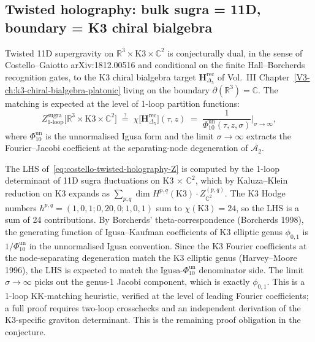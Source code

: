 \subsection{Twisted holography: bulk sugra = 11D, boundary = K3
chiral bialgebra}
\label{subsec:costello-twisted-holography}

\begin{conjecture}
\label{conj:costello-twisted-holography-matching}
Twisted 11D supergravity on
$\mathbb{R}^3 \times \mathrm{K3} \times \mathbb{C}^2$
is conjecturally dual, in the sense of Costello--Gaiotto
arXiv:1812.00516 and conditional on the finite Hall--Borcherds
recognition gates, to the K3 chiral bialgebra target
$\mathbf{H}_{\Delta_5}^{\mathrm{rec}}$ of Vol.~III
Chapter~\ref{V3-ch:k3-chiral-bialgebra-platonic} living on the
boundary $\partial(\mathbb{R}^3) = \mathbb{C}$. The matching is
expected at the level of 1-loop partition functions:
\begin{equation}
\label{eq:costello-twisted-holography-Z}
Z^{\mathrm{sugra}}_{1\text{-loop}}
 \bigl[\mathbb{R}^3\times\mathrm{K3}\times\mathbb{C}^2\bigr]
\;\stackrel{?}{=}\;
\chi\bigl[\mathbf{H}_{\Delta_5}^{\mathrm{rec}}\bigr](\tau,z)
\;=\;
\frac{1}{\Phi_{10}^{\mathrm{un}}(\tau,z,\sigma)}\bigg|_{\sigma\to\infty},
\end{equation}
where $\Phi_{10}^{\mathrm{un}}$ is the unnormalised Igusa form and the limit
$\sigma\to\infty$ extracts the Fourier--Jacobi coefficient at
the separating-node degeneration of $\overline{\mathcal{A}_2}$.
\end{conjecture}

\begin{remark}
\label{rem:costello-twisted-holography-heuristic}
The LHS of~\eqref{eq:costello-twisted-holography-Z} is
computed by the 1-loop determinant of 11D sugra fluctuations
on K3 $\times$ $\mathbb{C}^2$, which by Kaluza--Klein reduction on
K3 expands as
$\sum_{p,q} \dim H^{p,q}(\mathrm{K3}) \cdot Z^{(p,q)}_{\mathbb{C}^2}$.
The K3 Hodge numbers $h^{p,q} = (1,0,1;0,20,0;1,0,1)$ sum to
$\chi(\mathrm{K3}) = 24$, so the LHS is a sum of 24 contributions.
By Borcherds' theta-correspondence (Borcherds 1998), the
generating function of Igusa--Kaufman coefficients of K3 elliptic
genus $\phi_{0,1}$ is $1/\Phi_{10}^{\mathrm{un}}$ in the
unnormalised Igusa convention. Since the K3 Fourier
coefficients at the node-separating degeneration match the
K3 elliptic genus (Harvey--Moore 1996), the LHS is expected to
match the Igusa-$\Phi_{10}^{\mathrm{un}}$ denominator side. The limit
$\sigma\to\infty$ picks out the genus-1 Jacobi component, which
is exactly $\phi_{0,1}$. This is a 1-loop KK-matching
heuristic, verified at the level of leading Fourier
coefficients; a full proof requires two-loop crosschecks
and an independent derivation of the K3-specific graviton
determinant. This is the remaining proof obligation in the conjecture.
\end{remark}

